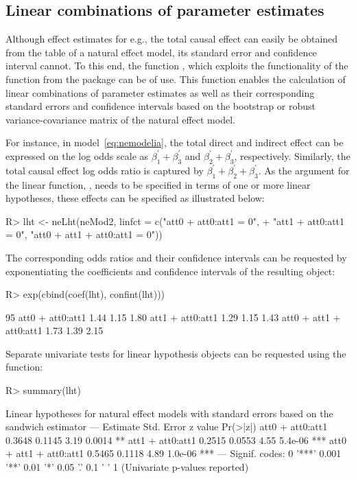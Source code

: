 \documentclass[nojss]{jss}
\begin{document}
\subsection{Linear combinations of parameter estimates}
Although effect estimates for e.g., the total causal effect can easily be obtained from the  table of a natural effect model, its standard error and confidence interval cannot. To this end, the function , which exploits the functionality of the  function from the  package \citep{R:multcomp} can be of use. This function enables the calculation of linear combinations of parameter estimates as well as their corresponding standard errors and confidence intervals based on the bootstrap or robust variance-covariance matrix of the natural effect model. 
\par For instance, in model~\eqref{eq:nemodelia}, the total direct and indirect effect can be expressed on the log odds scale as $\beta_1^\prime + \beta_3^\prime$ and $\beta_2^\prime + \beta_3^\prime$, respectively. Similarly, the total causal effect log odds ratio is captured by $\beta_1^\prime + \beta_2^\prime + \beta_3^\prime$. As the argument for the linear function, , needs to be specified in terms of one or more linear hypotheses, these effects can be specified as illustrated below:
\begin{Schunk}
\begin{Sinput}
R> lht <- neLht(neMod2, linfct = c("att0 + att0:att1 = 0",
+    "att1 + att0:att1 = 0", "att0 + att1 + att0:att1 = 0"))
\end{Sinput}
\end{Schunk}
The corresponding odds ratios and their confidence intervals can be requested by exponentiating the coefficients and confidence intervals of the resulting object:
\begin{Schunk}
\begin{Sinput}
R> exp(cbind(coef(lht), confint(lht)))
\end{Sinput}
\begin{Soutput}
                             95%
att0 + att0:att1        1.44    1.15    1.80
att1 + att0:att1        1.29    1.15    1.43
att0 + att1 + att0:att1 1.73    1.39    2.15
\end{Soutput}
\end{Schunk}
Separate univariate tests for linear hypothesis objects can be requested using the  function:
\begin{Schunk}
\begin{Sinput}
R> summary(lht)
\end{Sinput}
\begin{Soutput}
Linear hypotheses for natural effect models
with standard errors based on the sandwich estimator
---
                        Estimate Std. Error z value Pr(>|z|)    
att0 + att0:att1          0.3648     0.1145    3.19   0.0014 ** 
att1 + att0:att1          0.2515     0.0553    4.55  5.4e-06 ***
att0 + att1 + att0:att1   0.5465     0.1118    4.89  1.0e-06 ***
---
Signif. codes:  0 '***' 0.001 '**' 0.01 '*' 0.05 '.' 0.1 ' ' 1
(Univariate p-values reported)
\end{Soutput}
\end{Schunk}
\end{document}
